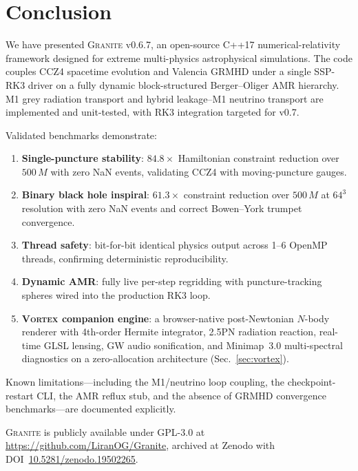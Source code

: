 \documentclass[aps,prd,twocolumn,superscriptaddress,nofootinbib,showpacs,
               longbibliography]{revtex4-2}
\newcommand{\granite}{\textsc{Granite}}
\begin{document}
\section{Conclusion}
\label{sec:conclusion}

We have presented \granite{} v0.6.7, an open-source C++17 numerical-relativity
framework designed for extreme multi-physics astrophysical simulations.
The code couples CCZ4 spacetime evolution and Valencia GRMHD under a single
SSP-RK3 driver on a fully dynamic block-structured Berger--Oliger AMR
hierarchy.
M1 grey radiation transport and hybrid leakage--M1 neutrino transport are
implemented and unit-tested, with RK3 integration targeted for v0.7.

Validated benchmarks demonstrate:
\begin{enumerate}[nosep]
  \item \textbf{Single-puncture stability}: $84.8\times$ Hamiltonian
    constraint reduction over $500\,M$ with zero NaN events, validating CCZ4
    with moving-puncture gauges.
  \item \textbf{Binary black hole inspiral}: $61.3\times$ constraint reduction
    over $500\,M$ at $64^3$ resolution with zero NaN events and correct
    Bowen--York trumpet convergence.
  \item \textbf{Thread safety}: bit-for-bit identical physics output across
    1--6 OpenMP threads, confirming deterministic reproducibility.
  \item \textbf{Dynamic AMR}: fully live per-step regridding with
    puncture-tracking spheres wired into the production RK3 loop.
  \item \textbf{\textsc{Vortex} companion engine}: a browser-native
    post-Newtonian $N$-body renderer with 4th-order Hermite integrator,
    2.5PN radiation reaction, real-time GLSL lensing, GW audio sonification,
    and Minimap~3.0 multi-spectral diagnostics on a zero-allocation
    architecture (Sec.~\ref{sec:vortex}).
\end{enumerate}

Known limitations---including the M1/neutrino loop coupling, the
checkpoint-restart CLI, the AMR reflux stub, and the absence of
GRMHD convergence benchmarks---are documented explicitly.

\granite{} is publicly available under GPL-3.0 at
\url{https://github.com/LiranOG/Granite}, archived at Zenodo with
DOI~\href{https://doi.org/10.5281/zenodo.19502265}{10.5281/zenodo.19502265}.
\end{document}
